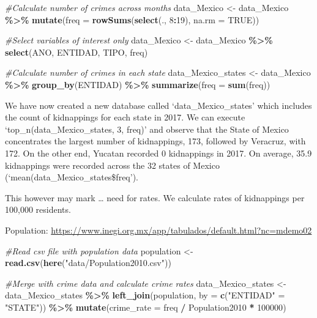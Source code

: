 \documentclass[
]{article}
\newenvironment{Shaded}{\begin{snugshade}}{\end{snugshade}}
\newcommand{\AttributeTok}[1]{\textcolor[rgb]{0.13,0.29,0.53}{#1}}
\newcommand{\CommentTok}[1]{\textcolor[rgb]{0.56,0.35,0.01}{\textit{#1}}}
\newcommand{\ConstantTok}[1]{\textcolor[rgb]{0.56,0.35,0.01}{#1}}
\newcommand{\DecValTok}[1]{\textcolor[rgb]{0.00,0.00,0.81}{#1}}
\newcommand{\FunctionTok}[1]{\textcolor[rgb]{0.13,0.29,0.53}{\textbf{#1}}}
\newcommand{\NormalTok}[1]{#1}
\newcommand{\OtherTok}[1]{\textcolor[rgb]{0.56,0.35,0.01}{#1}}
\newcommand{\SpecialCharTok}[1]{\textcolor[rgb]{0.81,0.36,0.00}{\textbf{#1}}}
\newcommand{\StringTok}[1]{\textcolor[rgb]{0.31,0.60,0.02}{#1}}
\begin{document}
\begin{Shaded}
\begin{Highlighting}[]
\CommentTok{\#Calculate number of crimes across months}
\NormalTok{data\_Mexico }\OtherTok{\textless{}{-}}\NormalTok{ data\_Mexico }\SpecialCharTok{\%\textgreater{}\%}
  \FunctionTok{mutate}\NormalTok{(}\AttributeTok{freq =} \FunctionTok{rowSums}\NormalTok{(}\FunctionTok{select}\NormalTok{(., }\DecValTok{8}\SpecialCharTok{:}\DecValTok{19}\NormalTok{), }\AttributeTok{na.rm =} \ConstantTok{TRUE}\NormalTok{))}

\CommentTok{\#Select variables of interest only}
\NormalTok{data\_Mexico }\OtherTok{\textless{}{-}}\NormalTok{ data\_Mexico }\SpecialCharTok{\%\textgreater{}\%}
  \FunctionTok{select}\NormalTok{(ANO, ENTIDAD, TIPO, freq)}

\CommentTok{\#Calculate number of crimes in each state}
\NormalTok{data\_Mexico\_states }\OtherTok{\textless{}{-}}\NormalTok{ data\_Mexico }\SpecialCharTok{\%\textgreater{}\%}
  \FunctionTok{group\_by}\NormalTok{(ENTIDAD) }\SpecialCharTok{\%\textgreater{}\%}
  \FunctionTok{summarize}\NormalTok{(}\AttributeTok{freq =} \FunctionTok{sum}\NormalTok{(freq))}
\end{Highlighting}
\end{Shaded}

We have now created a new database called `data\_Mexico\_states' which
includes the count of kidnappings for each state in 2017. We can execute
`top\_n(data\_Mexico\_states, 3, freq)' and observe that the State of
Mexico concentrates the largest number of kidnappings, 173, followed by
Veracruz, with 172. On the other end, Yucatan recorded 0 kidnappings in
2017. On average, 35.9 kidnappings were recorded across the 32 states of
Mexico (`mean(data\_Mexico\_states\$freq').

This however may mark \ldots{} need for rates. We calculate rates of
kidnappings per 100,000 residents.

Population:
\url{https://www.inegi.org.mx/app/tabulados/default.html?nc=mdemo02}

\begin{Shaded}
\begin{Highlighting}[]
\CommentTok{\#Read csv file with population data}
\NormalTok{population }\OtherTok{\textless{}{-}} \FunctionTok{read.csv}\NormalTok{(}\FunctionTok{here}\NormalTok{(}\StringTok{"data/Population2010.csv"}\NormalTok{))}

\CommentTok{\#Merge with crime data and calculate crime rates}
\NormalTok{data\_Mexico\_states }\OtherTok{\textless{}{-}}\NormalTok{ data\_Mexico\_states }\SpecialCharTok{\%\textgreater{}\%}
  \FunctionTok{left\_join}\NormalTok{(population, }\AttributeTok{by =} \FunctionTok{c}\NormalTok{(}\StringTok{"ENTIDAD"} \OtherTok{=} \StringTok{"STATE"}\NormalTok{)) }\SpecialCharTok{\%\textgreater{}\%}
  \FunctionTok{mutate}\NormalTok{(}\AttributeTok{crime\_rate =}\NormalTok{ freq }\SpecialCharTok{/}\NormalTok{ Population2010 }\SpecialCharTok{*} \DecValTok{100000}\NormalTok{)}
\end{Highlighting}
\end{Shaded}
\end{document}
